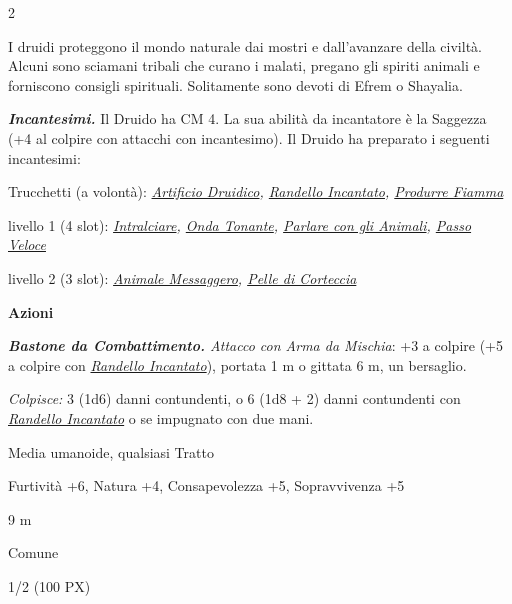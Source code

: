 \begin{multicols}{2}
{I druidi proteggono il mondo naturale dai mostri e dall'avanzare della civiltà. Alcuni sono sciamani tribali che curano i malati, pregano gli spiriti animali e forniscono consigli spirituali. Solitamente sono devoti di Efrem o Shayalia.

\emph{\textbf{Incantesimi.}} Il Druido ha CM 4. La sua abilità da incantatore è la Saggezza (+4 al colpire con attacchi con incantesimo). Il Druido ha preparato i seguenti incantesimi:

Trucchetti (a volontà): \emph{\hyperlink{Artificio Druidico}{Artificio Druidico}, \hyperlink{Randello Incantato}{Randello Incantato}, \hyperlink{Produrre Fiamma}{Produrre Fiamma}}

livello 1 (4 slot): \emph{\hyperlink{Intralciare}{Intralciare}, \hyperlink{Onda Tonante}{Onda Tonante}, \hyperlink{Parlare con gli Animali}{Parlare con gli Animali}, \hyperlink{Passo Veloce}{Passo Veloce}}

livello 2 (3 slot): \emph{\hyperlink{Animale Messaggero}{Animale Messaggero}, \hyperlink{Pelle di Corteccia}{Pelle di Corteccia}}

\textbf{Azioni}

\emph{\textbf{Bastone da Combattimento.} Attacco con Arma da Mischia}: +3 a colpire (+5 a colpire con \emph{\hyperlink{Randello Incantato}{Randello Incantato}}), portata 1 m o gittata 6 m, un bersaglio.

\emph{Colpisce:} 3 (1d6) danni contundenti, o 6 (1d8 + 2) danni contundenti con \emph{\hyperlink{Randello Incantato}{Randello Incantato}} o se impugnato con due mani.

\begin{description}[noitemsep, topsep=0pt, parsep=0pt, partopsep=0pt, itemsep=1pt, leftmargin=2.35cm,  labelwidth=2.2cm, itemindent=0cm, listparindent=0pt] %
\setlength{\baselineskip}{10pt}
\item[\textbf{Taglia/Tipo}] Media umanoide, qualsiasi Tratto
\item[\textbf{Caratt.}] 
\item[\textbf{Punti Ferita}] 
\item[\textbf{Comp.}] Furtività +6, Natura +4, Consapevolezza +5, Sopravvivenza +5
\item[\textbf{Tiri Salvez.}] 
\item[\textbf{Movimento}] 9 m
\item[\textbf{Linguaggi}] Comune
\item[\textbf{Sfida}] 1/2 (100 PX)
\end{description}
\smallskip

}
\end{multicols}
